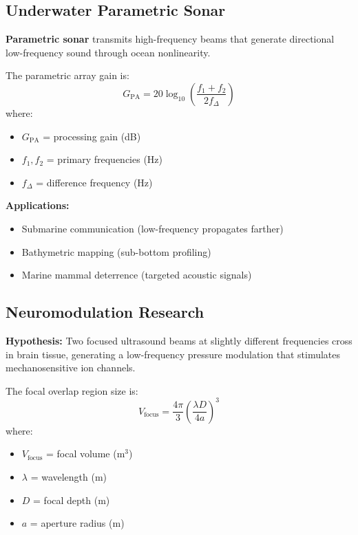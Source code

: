 \subsection{Underwater Parametric Sonar}

\textbf{Parametric sonar} transmits high-frequency beams that generate directional low-frequency sound through ocean nonlinearity.

The parametric array gain is:
\begin{equation}
G_{\text{PA}} = 20\log_{10}\left(\frac{f_1 + f_2}{2f_\Delta}\right)
\end{equation}
where:
\begin{itemize}
\item $G_{\text{PA}}$ = processing gain (dB)
\item $f_1, f_2$ = primary frequencies (Hz)
\item $f_\Delta$ = difference frequency (Hz)
\end{itemize}

\textbf{Applications:}
\begin{itemize}
\item Submarine communication (low-frequency propagates farther)
\item Bathymetric mapping (sub-bottom profiling)
\item Marine mammal deterrence (targeted acoustic signals)
\end{itemize}

\subsection{Neuromodulation Research}

\textbf{Hypothesis:} Two focused ultrasound beams at slightly different frequencies cross in brain tissue, generating a low-frequency pressure modulation that stimulates mechanosensitive ion channels.

The focal overlap region size is:
\begin{equation}
V_{\text{focus}} = \frac{4\pi}{3}\left(\frac{\lambda D}{4a}\right)^3
\end{equation}
where:
\begin{itemize}
\item $V_{\text{focus}}$ = focal volume (m$^3$)
\item $\lambda$ = wavelength (m)
\item $D$ = focal depth (m)
\item $a$ = aperture radius (m)
\end{itemize}

